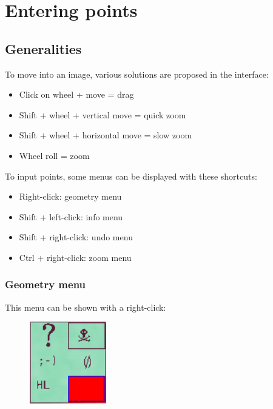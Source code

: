 
\section{Entering points}

\subsection{Generalities}


To move into an image, various solutions are proposed in the interface:
\begin{itemize}
\item Click on wheel + move = drag
\item Shift + wheel + vertical move = quick zoom
\item Shift + wheel + horizontal move = slow zoom
\item Wheel roll = zoom
\end{itemize}

\vspace{\baselineskip}
To input points, some menus can be displayed with these shortcuts:
\begin{itemize}
\item Right-click: geometry menu
\item Shift + left-click: info menu
\item Shift + right-click: undo menu
\item Ctrl + right-click: zoom menu
\end{itemize}

\subsubsection{Geometry menu}

This menu can be shown with a right-click:

\begin{figure}[H]
\begin{center}
\includegraphics[width=95pt]{FIGS/Saisie/geometry.png}
\end{center}
\label{FIG:button1}
\end{figure}

